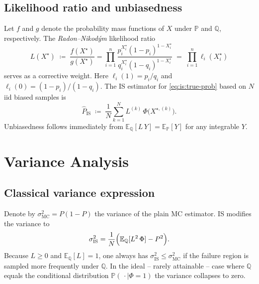 \subsection{Likelihood ratio and unbiasedness}
Let \(f\) and \(g\) denote the probability mass functions of \(X\) under
\(\mathbb{P}\) and \(\mathbb{Q}\), respectively.  The \emph{Radon–Nikodým}
likelihood ratio
\begin{equation}
  L(X^{\star})\;\coloneqq\;\frac{f(X^{\star})}{g(X^{\star})}
          =\prod_{i=1}^{n}\frac{p_{i}^{X^{\star}_{i}}(1-p_{i})^{1-X^{\star}_{i}}}
                                      {q_{i}^{X^{\star}_{i}}(1-q_{i})^{1-X^{\star}_{i}}}
          \;=\;\prod_{i=1}^{n}\ell_{i}(X^{\star}_{i})                              
  \label{eq:is:lr}
\end{equation}
serves as a corrective weight.  Here
\(\ell_{i}(1)=p_{i}/q_{i}\) and \(\ell_{i}(0)=(1-p_{i})/(1-q_{i})\).  The IS
estimator for \eqref{eq:is:true-prob} based on \(N\) iid biased samples is
\begin{equation}
  \widehat{P}_{\!\text{IS}}
     \;\coloneqq\;\frac{1}{N}\sum_{k=1}^{N} L^{(k)}\,\Phi\bigl(X^{\star,(k)}\bigr).
  \label{eq:is:estimator}
\end{equation}
Unbiasedness follows immediately from
\(\mathbb{E}_{\mathbb{Q}}[L\,Y]=\mathbb{E}_{\mathbb{P}}[Y]\) for any
integrable \(Y\).

\section{Variance Analysis}
\label{sec:is:variance}

\subsection{Classical variance expression}
Denote by \(\sigma^{2}_{\text{MC}}=P(1-P)\) the variance of the plain MC
estimator.  IS modifies the variance to
\begin{equation}
  \sigma^{2}_{\text{IS}}
    =\frac{1}{N}\Bigl(\mathbb{E}_{\mathbb{Q}}[L^{2}\,\Phi] - P^{2}\Bigr).
  \label{eq:is:var}
\end{equation}
Because \(L\ge0\) and \(\mathbb{E}_{\mathbb{Q}}[L]=1\), one always has
\(\sigma^{2}_{\text{IS}}\le\sigma^{2}_{\text{MC}}\) if the failure region is
sampled more frequently under \(\mathbb{Q}\).  In the ideal – rarely
attainable – case where \(\mathbb{Q}\) equals the conditional distribution
\(\mathbb{P}(\,\cdot\mid\Phi=1)\) the variance collapses to zero.

